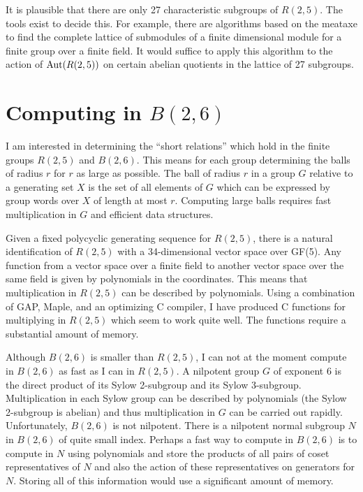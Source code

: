 \documentclass[12pt]{article}
\def\aut{{\rm Aut}}
\begin{document}
It is plausible that there are only 27 characteristic subgroups of
$R(2,5)$.  The tools exist to decide this.  For example, there are
algorithms based on the meataxe to find the complete lattice of
submodules of a finite dimensional module for a finite group over a
finite field.  It would suffice to apply this algorithm to the action
of $\aut(R(2,5))$ on certain abelian quotients in the lattice of 27
subgroups.

\section{Computing in $B(2,6)$}
I am interested in determining the ``short relations'' which hold in
the finite groups $R(2,5)$ and $B(2,6)$.  This means for each group
determining the balls of radius $r$ for $r$ as large as possible.  The
ball of radius $r$ in a group $G$ relative to a generating set $X$ is
the set of all elements of $G$ which can be expressed by group words
over $X$ of length at most $r$.  Computing large balls requires fast
multiplication in $G$ and efficient data structures.

Given a fixed polycyclic generating sequence for $R(2,5)$, there is a
natural identification of $R(2,5)$ with a 34-dimensional vector space
over GF(5).  Any function from a vector space over a finite field to
another vector space over the same field is given by polynomials in
the coordinates.  This means that multiplication in $R(2,5)$ can be
described by polynomials.  Using a combination of GAP, Maple, and an
optimizing C compiler, I have produced C functions for multiplying in
$R(2,5)$ which seem to work quite well.  The functions require a
substantial amount of memory.

Although $B(2,6)$ is smaller than $R(2,5)$, I can not at the moment
compute in $B(2,6)$ as fast as I can in $R(2,5)$.  A nilpotent group
$G$ of exponent 6 is the direct product of its Sylow 2-subgroup and
its Sylow 3-subgroup.  Multiplication in each Sylow group can be
described by polynomials (the Sylow 2-subgroup is abelian) and thus
multiplication in $G$ can be carried out rapidly.  Unfortunately,
$B(2,6)$ is not nilpotent.  There is a nilpotent normal subgroup $N$
in $B(2,6)$ of quite small index.  Perhaps a fast way to compute in
$B(2,6)$ is to compute in $N$ using polynomials and store the products
of all pairs of coset representatives of $N$ and also the action of
these representatives on generators for $N$.  Storing all of this
information would use a significant amount of memory.
\end{document}
